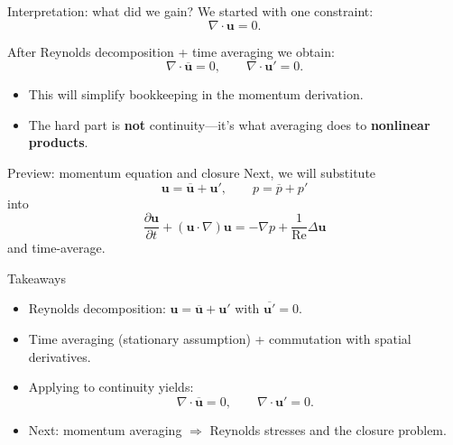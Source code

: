 \documentclass[aspectratio=169]{beamer}
\newcommand{\uu}{\bm{u}}
\newcommand{\pp}{p}
\newcommand{\Rey}{\mathrm{Re}}
\newcommand{\avg}[1]{\overline{#1}}
\newcommand{\up}{\uu'}
\newcommand{\ubar}{\avg{\uu}}
\begin{document}
\begin{frame}{Interpretation: what did we gain?}
We started with one constraint:
\[
\nabla\cdot\uu = 0.
\]

After Reynolds decomposition + time averaging we obtain:
\[
\nabla\cdot\ubar = 0,
\qquad
\nabla\cdot\up = 0.
\]

\begin{itemize}
  \item This will simplify bookkeeping in the momentum derivation.
  \item The hard part is \textbf{not} continuity---it’s what averaging does to \textbf{nonlinear products}.
\end{itemize}


\end{frame}

\begin{frame}{Preview: momentum equation and closure}
Next, we will substitute
\[
\uu=\ubar+\up,\qquad \pp=\avg{\pp}+\pp'
\]
into
\[
\frac{\partial \uu}{\partial t} + (\uu\cdot\nabla)\uu = -\nabla \pp + \frac{1}{\Rey}\Delta\uu
\]
and time-average.

\end{frame}

\begin{frame}{Takeaways}
\begin{itemize}
  \item Reynolds decomposition: $\uu=\ubar+\up$ with $\avg{\up}=0$.
  \item Time averaging (stationary assumption) + commutation with spatial derivatives.
  \item Applying to continuity yields:
  \[
  \nabla\cdot\ubar=0,\qquad \nabla\cdot\up=0.
  \]
  \item Next: momentum averaging $\Rightarrow$ Reynolds stresses and the closure problem.
\end{itemize}
\end{frame}
\end{document}
